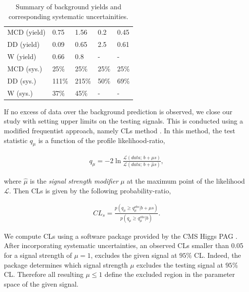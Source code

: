 \begin{table}[h]
\begin{center}
\begin{tabular}{l|l|l|l|l}
\hline
\hline
	& \tauTau\binone & \tauTau\bintwo & \eTau\binone & \muTau\binone \\
\hline
\hline
MCD (yield) & 0.75 & 1.56 & 0.2 & 0.45 \\
DD (yield) & 0.09 & 0.65 & 2.5 & 0.61 \\
W (yield) & 0.66	 & 0.8 & - & - \\
\hline
MCD (sys.) & 25\%	 & 25\% & 25\% & 25\% \\
DD (sys.) & 111\% & 	215\% & 50\% & 69\% \\
W (sys.) & 37\% & 45\% & - & - \\
\hline
\hline
\end{tabular}
\caption{Summary of background yields and corresponding systematic uncertainities.}
\label{tbl:yieldSysSummary}
\end{center}
\end{table}


If no excess of data over the background prediction is observed, 
we close our study with setting upper limits on the testing signals.
This is conducted using a modified frequentist approach, namely CLs method \cite{read:CLs}.
In this method, the test statistic $q_\mu$ 
is a function of the profile likelihood-ratio,

\begin{align}
q_\mu = -2 \ln \frac{\mathcal{L}(data ;\, b + \mu s)}{\mathcal{L}(data ;\, b + \hat{\mu} s)},
\end{align}

where $\hat\mu$ is the \textit{signal strength modifier} $\mu$ at the maximum point of the likelihood $\mathcal{L}$.
Then CLs is given by the following probability-ratio,

\begin{align}
CL_s = \frac{p(q_\mu \geq q_\mu^{obs} | b + \mu s )}{p(q_\mu \geq q_\mu^{obs} | b)}.
\end{align}
 
We compute CLs using a software package provided by the CMS Higgs PAG \cite{higgspag:software}.
After incorporating systematic uncertainties, an observed CLs smaller than 0.05 for a signal strength of $\mu = 1$, excludes the given signal at $95\%$ CL. Indeed, the package determines which signal strength $\mu$ excludes the testing signal at $95\%$ CL. Therefore all resulting $\mu \leq 1$ define the excluded region in the parameter space of the given signal. 

